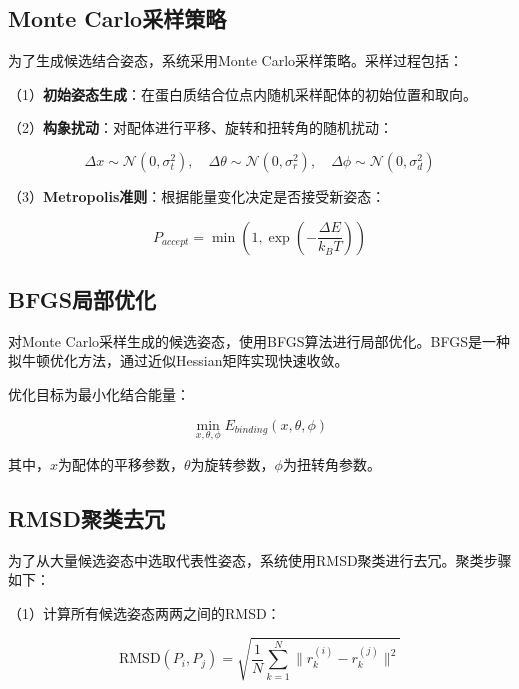 \subsection{Monte Carlo采样策略}

为了生成候选结合姿态，系统采用Monte Carlo采样策略。采样过程包括：

（1）\textbf{初始姿态生成}：在蛋白质结合位点内随机采样配体的初始位置和取向。

（2）\textbf{构象扰动}：对配体进行平移、旋转和扭转角的随机扰动：

\begin{equation}
\Delta x \sim \mathcal{N}(0, \sigma_t^2), \quad \Delta \theta \sim \mathcal{N}(0, \sigma_r^2), \quad \Delta \phi \sim \mathcal{N}(0, \sigma_d^2)
\end{equation}

（3）\textbf{Metropolis准则}：根据能量变化决定是否接受新姿态：

\begin{equation}
P_{accept} = \min\left(1, \exp\left(-\frac{\Delta E}{k_B T}\right)\right)
\end{equation}

\subsection{BFGS局部优化}

对Monte Carlo采样生成的候选姿态，使用BFGS算法进行局部优化。BFGS是一种拟牛顿优化方法，通过近似Hessian矩阵实现快速收敛。

优化目标为最小化结合能量：

\begin{equation}
\min_{x, \theta, \phi} E_{binding}(x, \theta, \phi)
\end{equation}

其中，$x$为配体的平移参数，$\theta$为旋转参数，$\phi$为扭转角参数。

\subsection{RMSD聚类去冗}

为了从大量候选姿态中选取代表性姿态，系统使用RMSD聚类进行去冗。聚类步骤如下：

（1）计算所有候选姿态两两之间的RMSD：

\begin{equation}
\text{RMSD}(P_i, P_j) = \sqrt{\frac{1}{N}\sum_{k=1}^{N}\|r_k^{(i)} - r_k^{(j)}\|^2}
\end{equation}

